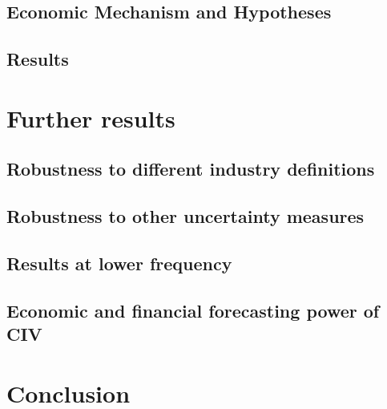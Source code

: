 \documentclass[16pt]{article}
\begin{document}
\subsection{Economic Mechanism and Hypotheses}
\subsection{Results}


\section{Further results} \label{sec:Model}
\subsection{Robustness to different industry definitions}
\subsection{Robustness to other uncertainty measures}
\subsection{Results at lower frequency}
\subsection{Economic and financial forecasting power of CIV}

\section{Conclusion} \label{sec:Model}



\newpage

\end{document}
